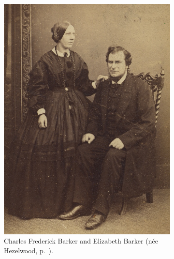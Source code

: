 \begin{figure}
	\centering
	\begin{subfigure}{.48\textwidth}
		\label{Charles_Frederick_Barker_and_Elizabeth_Hezelwood}
		\includegraphics{photos/Charles_Frederick_Barker_and_Elizabeth_Hezelwood}
		\caption{Charles Frederick Barker and Elizabeth Barker (n\'{e}e Hezelwood, p.~\pageref{Elizabeth_Hezelwood}).}
	\end{subfigure}
	\begin{subfigure}{.48\textwidth}

\end{subfigure}
\end{figure}
